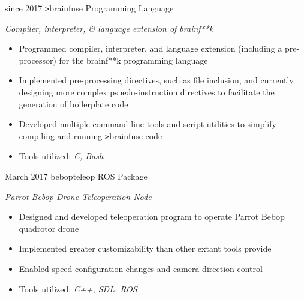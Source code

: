 \documentclass[]{friggeri-cv}
\begin{document}
\begin{entrylist}
  \entry
    {since 2017}
    {\texttt{>}brainfuse}
    {Programming Language}
    {\emph{Compiler, interpreter, \& language extension of brainf**k}
    \begin{itemize}[leftmargin=1.2em]
    \item Programmed compiler, interpreter, and language extension (including a pre-processor) for the brainf**k programming language
    \item Implemented pre-processing directives, such as file inclusion, and currently designing more complex psuedo-instruction directives to facilitate the generation of boilerplate code
    \item Developed multiple command-line tools and script utilities to simplify compiling and running \texttt{>}brainfuse code
    \item Tools utilized: \emph{C, Bash}
    \end{itemize}}
    
  \entry
    {March 2017}
    {bebop\textunderscore teleop}
    {ROS Package}
    {\emph{Parrot Bebop Drone Teleoperation Node}
    \begin{itemize}[leftmargin=1.2em]
    \item Designed and developed teleoperation program to operate Parrot Bebop quadrotor drone
    \item Implemented greater customizability than other extant tools provide
    \item Enabled speed configuration changes and camera direction control
    \item Tools utilized: \emph{C++, SDL, ROS}
    \end{itemize}
    }
    
    
\end{entrylist}
\end{document}
